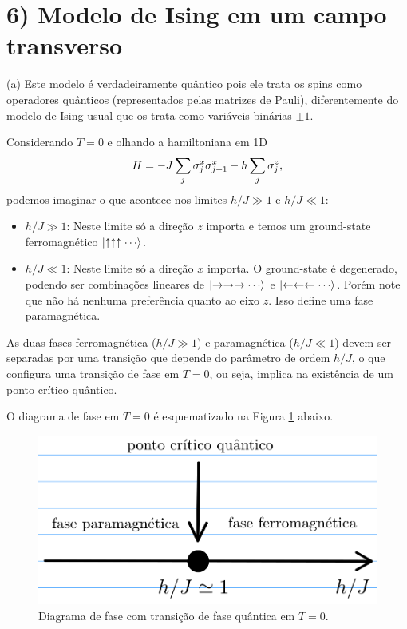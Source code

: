 \documentclass[a4paper,10pt]{article}
\begin{document}
\pagebreak

\section*{6) Modelo de Ising em um campo transverso}

(a) Este modelo é verdadeiramente quântico pois ele trata os spins como operadores quânticos (representados pelas matrizes de Pauli), diferentemente do modelo de Ising usual que os trata como variáveis binárias $\pm 1$.

\n

Considerando $T = 0$ e olhando a hamiltoniana em 1D
$$
H = -J \sum_{j} \sigma_j^x \sigma_{j+1}^x - h \sum_{j} \sigma_j^z,
$$
podemos imaginar o que acontece nos limites $h/J \gg 1$ e $h/J \ll 1$:
\begin{itemize}
\item $h / J \gg 1$: Neste limite só a direção $z$ importa e temos um ground-state ferromagnético $\ket{\uparrow\uparrow\uparrow\cdots}$.

\item $h / J \ll 1$: Neste limite só a direção $x$ importa. O ground-state é degenerado, podendo ser combinações lineares de $\ket{\rightarrow\rightarrow\rightarrow\cdots}$ e $\ket{\leftarrow\leftarrow\leftarrow\cdots}$. Porém note que não há nenhuma preferência quanto ao eixo $z$. Isso define uma fase paramagnética.
\end{itemize}

As duas fases ferromagnética ($h/J \gg 1$) e paramagnética ($h/J \ll 1$) devem ser separadas por uma transição que depende do parâmetro de ordem $h/J$, o que configura uma transição de fase em $T = 0$, ou seja, implica na existência de um ponto crítico quântico.

\n

O diagrama de fase em $T = 0$ é esquematizado na Figura \ref{fig:qcp} abaixo.
\begin{figure}[H]
\centering
\includegraphics[width=0.8\linewidth]{fig/qcp.png}
\caption{Diagrama de fase com transição de fase quântica em $T=0$.}
\label{fig:qcp}
\end{figure}
\end{document}
